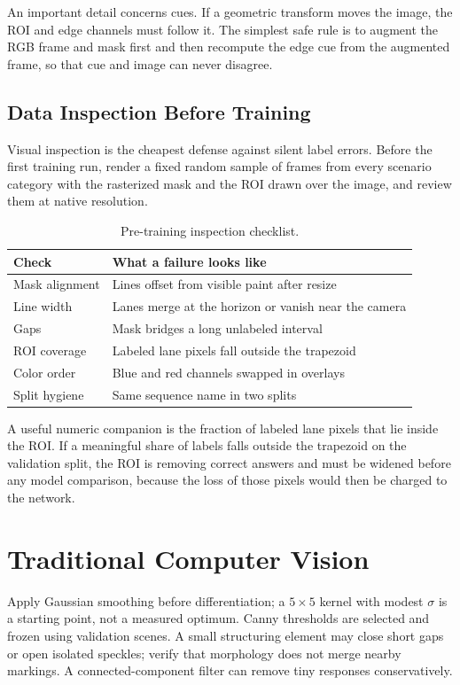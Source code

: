 \documentclass[10pt,a4paper,twocolumn]{article}
\begin{document}
An important detail concerns cues. If a geometric transform moves the image, the ROI and edge channels must follow it. The simplest safe rule is to augment the RGB frame and mask first and then recompute the edge cue from the augmented frame, so that cue and image can never disagree.

\subsection{Data Inspection Before Training}
Visual inspection is the cheapest defense against silent label errors. Before the first training run, render a fixed random sample of frames from every scenario category with the rasterized mask and the ROI drawn over the image, and review them at native resolution.

\begin{table}[H]
\centering
\caption{Pre-training inspection checklist.}
\footnotesize
\begin{tabularx}{\columnwidth}{|l|X|}
\hline
\rowcolor{gray!18}\textbf{Check}&\textbf{What a failure looks like}\\ \hline
Mask alignment & Lines offset from visible paint after resize\\ \hline
Line width & Lanes merge at the horizon or vanish near the camera\\ \hline
Gaps & Mask bridges a long unlabeled interval\\ \hline
ROI coverage & Labeled lane pixels fall outside the trapezoid\\ \hline
Color order & Blue and red channels swapped in overlays\\ \hline
Split hygiene & Same sequence name in two splits\\ \hline
\end{tabularx}
\end{table}

A useful numeric companion is the fraction of labeled lane pixels that lie inside the ROI. If a meaningful share of labels falls outside the trapezoid on the validation split, the ROI is removing correct answers and must be widened before any model comparison, because the loss of those pixels would then be charged to the network.

\section{Traditional Computer Vision}\label{sec:cv}
Apply Gaussian smoothing before differentiation; a $5\times5$ kernel with modest $\sigma$ is a starting point, not a measured optimum. Canny thresholds are selected and frozen using validation scenes. A small structuring element may close short gaps or open isolated speckles; verify that morphology does not merge nearby markings. A connected-component filter can remove tiny responses conservatively.
\end{document}
